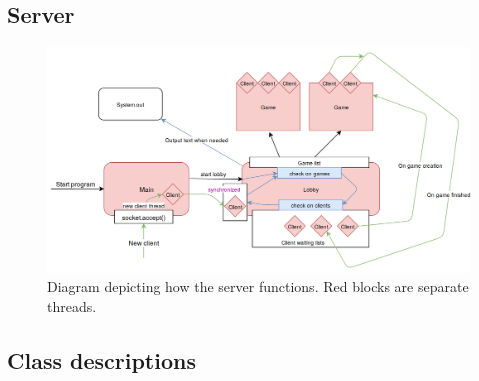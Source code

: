 \documentclass[12pt, letterpaper]{article}
\begin{document}


    \subsection{Server}

    \begin{figure}[ht]
        \begin{center}
            \includegraphics[width=\textwidth]{Server.png}
            \caption{Diagram depicting how the server functions.
            Red blocks are separate threads.}
            \label{fig:serverDiagram}
        \end{center}
    \end{figure}




    \subsection{Class descriptions}
    \label{sec:Descriptions}
\end{document}
